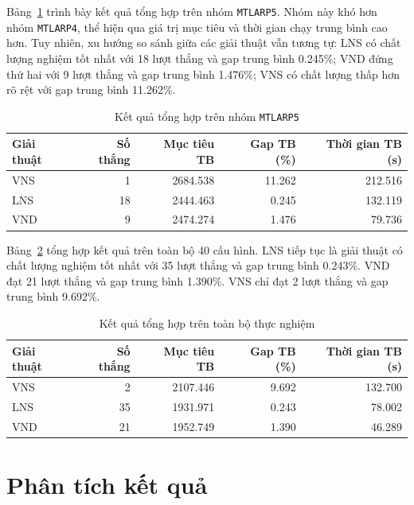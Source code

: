 Bảng~\ref{tab:summary-mtlarp5} trình bày kết quả tổng hợp trên nhóm \texttt{MTLARP5}. Nhóm này khó hơn nhóm \texttt{MTLARP4}, thể hiện qua giá trị mục tiêu và thời gian chạy trung bình cao hơn. Tuy nhiên, xu hướng so sánh giữa các giải thuật vẫn tương tự: LNS có chất lượng nghiệm tốt nhất với 18 lượt thắng và gap trung bình 0.245\%; VND đứng thứ hai với 9 lượt thắng và gap trung bình 1.476\%; VNS có chất lượng thấp hơn rõ rệt với gap trung bình 11.262\%.

\begin{table}[H]
\centering
\caption{Kết quả tổng hợp trên nhóm \texttt{MTLARP5}}
\label{tab:summary-mtlarp5}
\begin{tabular}{lrrrr}
\toprule
\textbf{Giải thuật} & \textbf{Số thắng} & \textbf{Mục tiêu TB} & \textbf{Gap TB (\%)} & \textbf{Thời gian TB (s)} \\
\midrule
VNS & 1  & 2684.538 & 11.262 & 212.516 \\
LNS & 18 & 2444.463 & 0.245  & 132.119 \\
VND & 9  & 2474.274 & 1.476  & 79.736 \\
\bottomrule
\end{tabular}
\end{table}

Bảng~\ref{tab:summary-all} tổng hợp kết quả trên toàn bộ 40 cấu hình. LNS tiếp tục là giải thuật có chất lượng nghiệm tốt nhất với 35 lượt thắng và gap trung bình 0.243\%. VND đạt 21 lượt thắng và gap trung bình 1.390\%. VNS chỉ đạt 2 lượt thắng và gap trung bình 9.692\%.

\begin{table}[H]
\centering
\caption{Kết quả tổng hợp trên toàn bộ thực nghiệm}
\label{tab:summary-all}
\begin{tabular}{lrrrr}
\toprule
\textbf{Giải thuật} & \textbf{Số thắng} & \textbf{Mục tiêu TB} & \textbf{Gap TB (\%)} & \textbf{Thời gian TB (s)} \\
\midrule
VNS & 2  & 2107.446 & 9.692 & 132.700 \\
LNS & 35 & 1931.971 & 0.243 & 78.002 \\
VND & 21 & 1952.749 & 1.390 & 46.289 \\
\bottomrule
\end{tabular}
\end{table}

\section{Phân tích kết quả}
\label{sec:experiment-analysis}

